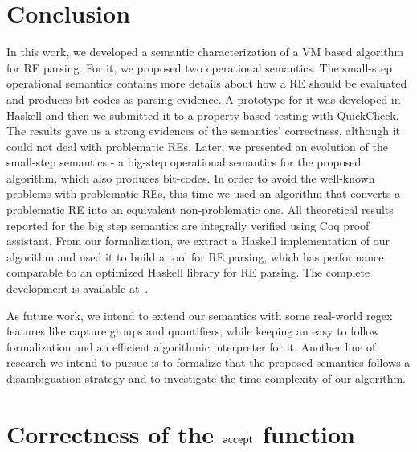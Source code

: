 \documentclass[oneside,12pt]{scrbook}
\theoremstyle{definition}
\newcommand{\F}[1]{\green{\mathsf{#1}}}
\theoremstyle{plain}
\theoremstyle{definition}
\begin{document}




\chapter{Conclusion}\label{chapter:conclusion}

In this work, we developed a semantic characterization of a VM based algorithm for RE parsing. For it, we proposed two operational semantics. The small-step operational semantics contains more details about how a RE should be evaluated and produces bit-codes as parsing evidence. A prototype for it was developed in Haskell and then we submitted it to a property-based testing with QuickCheck. The results gave us a strong evidences of the semantics' correctness, although it could not deal with problematic REs. Later, we presented an evolution of the small-step semantics - a big-step operational semantics for the proposed algorithm, which also produces bit-codes. In order to avoid the well-known problems with problematic REs, this time we used an algorithm that converts a problematic RE into an equivalent non-problematic one. All theoretical results reported for the big step semantics  are integrally verified using Coq proof assistant. From our formalization, we extract a Haskell implementation of our algorithm and used it to build a tool for RE parsing, which has performance comparable to an optimized Haskell library for RE parsing. The complete development is available at~\cite{regexvm-rep}.

As future work, we intend to extend our semantics with some real-world regex features like capture groups and quantifiers, while keeping an easy to follow formalization and an efficient algorithmic interpreter for it. Another line of research we intend to pursue is to formalize that the proposed semantics follows a disambiguation strategy and to investigate the time complexity of our algorithm.




\appendix



\chapter{Correctness of the \ensuremath{\F{accept}} function}\label{appendix:accept}
\end{document}

